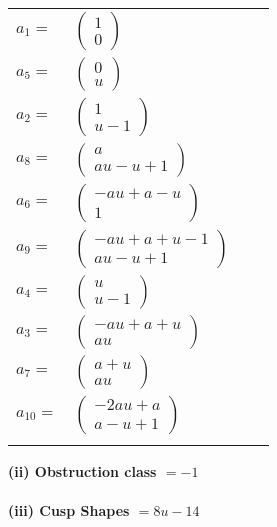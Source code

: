 \documentclass[1p]{elsarticle_modified}
\theoremstyle{definition}
\begin{document}
\begin{tabular}{m{7pt} m{180pt} m{7pt} m{180pt} }
\flushright $a_{1}=$&$\begin{pmatrix}1\\0\end{pmatrix}$ \\
\flushright $a_{5}=$&$\begin{pmatrix}0\\u\end{pmatrix}$ \\
\flushright $a_{2}=$&$\begin{pmatrix}1\\u-1\end{pmatrix}$ \\
\flushright $a_{8}=$&$\begin{pmatrix}a\\a u- u+1\end{pmatrix}$ \\
\flushright $a_{6}=$&$\begin{pmatrix}- a u+a- u\\1\end{pmatrix}$ \\
\flushright $a_{9}=$&$\begin{pmatrix}- a u+a+u-1\\a u- u+1\end{pmatrix}$ \\
\flushright $a_{4}=$&$\begin{pmatrix}u\\u-1\end{pmatrix}$ \\
\flushright $a_{3}=$&$\begin{pmatrix}- a u+a+u\\a u\end{pmatrix}$ \\
\flushright $a_{7}=$&$\begin{pmatrix}a+u\\a u\end{pmatrix}$ \\
\flushright $a_{10}=$&$\begin{pmatrix}-2 a u+a\\a- u+1\end{pmatrix}$\\&\end{tabular}
\flushleft \textbf{(ii) Obstruction class $= -1$}\\~\\
\flushleft \textbf{(iii) Cusp Shapes $= 8 u-14$}\\~\\
\end{document}
